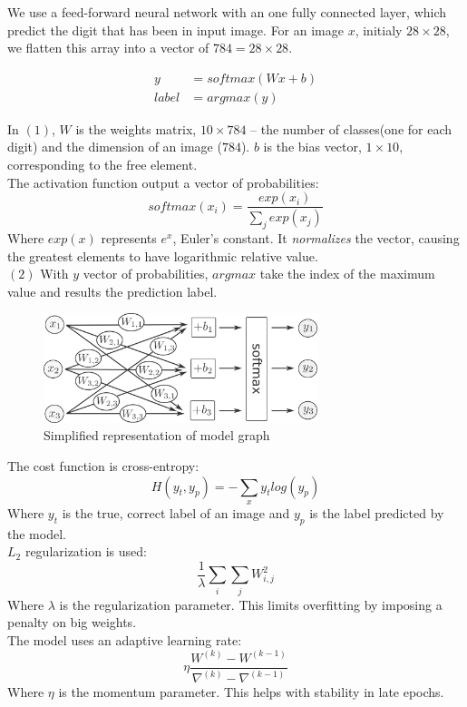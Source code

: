 \documentclass[a4paper]{article}
\begin{document}
We use a feed-forward neural network with an one fully connected layer, which predict the digit that has been in input image.
For an image $x$, initialy $28 \times 28$, we flatten this array into a vector of $784 = 28 \times 28$.


\begin{align}
y &= softmax(Wx + b) \\
label &= argmax(y)
\end{align}

In $(1)$, $W$ is the weights matrix, $10 \times 784$ -- the number of classes(one for each digit) and the dimension of an image ($784$). $b$ is the bias vector, $1 \times 10$, corresponding to the free element.
\\

The activation function output a vector of probabilities:
$$softmax(x_i)=\frac{exp(x_i)}{\sum_j exp(x_j)}$$
Where $exp(x)$ represents $e^x$, Euler's constant. It \textit{normalizes} the vector, causing the greatest elements to have logarithmic relative value.
\\

$(2)$ With $y$ vector of probabilities, $argmax$ take the index of the maximum value and results the prediction label.

\begin{figure}[htb]
\centering
\includegraphics[width=8cm]{images/model-graph.png}
\caption{Simplified representation of model graph \cite{tf}}
\end{figure}

The cost function is cross-entropy:
$$H(y_t, y_p)=-\sum_x y_t log(y_p)$$
Where $y_t$ is the true, correct label of an image and $y_p$ is the label predicted by the model.
\\

$L_2$ regularization is used:
$$\frac{1}{\lambda} \sum_i \sum_j W_{i,j}^2$$
Where $\lambda$ is the regularization parameter. This limits overfitting by imposing a penalty on big weights.
\\

The model uses an adaptive learning rate:
$$\eta \frac{ W^{(k)} - W^{(k-1)} } { \nabla^{(k)} - \nabla^{(k-1)} }$$
Where $\eta$ is the momentum parameter. This helps with stability in late epochs.
\end{document}
